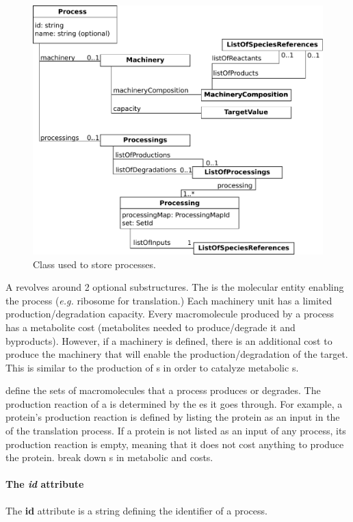 \begin{figure}
  \centering
  \includegraphics[scale=0.8]{figures/processes_process}
  \caption{Class used to store processes.}
\label{fig:processes_process}
\end{figure}

A \process{} revolves around 2 optional substructures.
The \machinery{} is the molecular entity enabling the process
(\textit{e.g.} ribosome for translation.)
Each machinery unit has a limited production/degradation capacity.
Every macromolecule produced by a process has a metabolite cost
(metabolites needed to produce/degrade it and byproducts).
However, if a machinery is defined, there is an additional cost
to produce the machinery that will enable the production/degradation of the
target.
This is similar to the production of \enzyme{}s in order to catalyze
metabolic \reaction{}s.

\processings{} define the sets of macromolecules that a process
produces or degrades.
The production reaction of a \macromolecule{} is determined by the \process{}es
it goes through.
For example, a protein's production reaction is defined by listing
the protein as an input in the \processings{} of the translation process.
If a protein is not listed as an input of any process, its production reaction
is empty, meaning that it does not cost anything to produce the protein.
\processings{} break down \macromolecule{}s in metabolic \species{}
and \machinery{} costs.

\paragraph{The \textit{id} attribute}
The \textbf{id} attribute is a string defining the identifier of a process.

